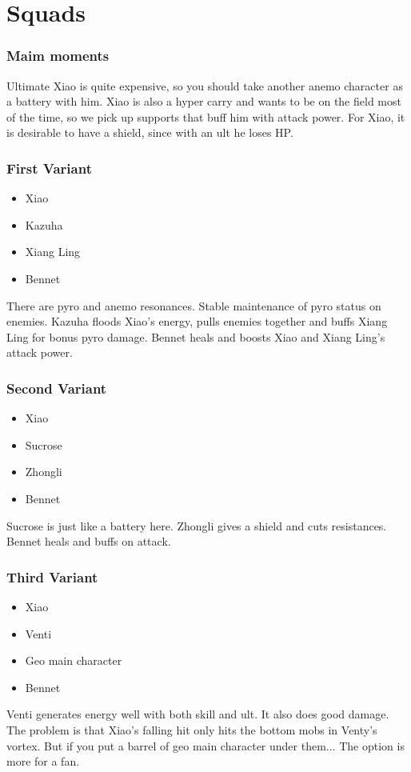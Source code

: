 \documentclass{beamer}
\begin{document}
\section{Squads}
\begin{frame}
\frametitle{Maim moments} 
Ultimate Xiao is quite expensive, so you should take another anemo character as a battery with him. Xiao is also a hyper carry and wants to be on the field most of the time, so we pick up supports that buff him with attack power. For Xiao, it is desirable to have a shield, since with an ult he loses HP.

\end{frame}
\begin{frame}
\frametitle{First Variant}
 \begin{itemize}
     \item Xiao
     \item Kazuha
     \item Xiang Ling
     \item Bennet
 \end{itemize}
 There are pyro and anemo resonances. Stable maintenance of pyro status on enemies. Kazuha floods Xiao's energy, pulls enemies together and buffs Xiang Ling for bonus pyro damage. Bennet heals and boosts Xiao and Xiang Ling's attack power.
\end{frame}

\begin{frame}
\frametitle{Second Variant}
 \begin{itemize}
     \item Xiao
     \item Sucrose
     \item Zhongli
     \item Bennet
 \end{itemize}
Sucrose is just like a battery here. Zhongli gives a shield and cuts resistances. Bennet heals and buffs on attack.
\end{frame}

\begin{frame}
\frametitle{Third Variant}
 \begin{itemize}
     \item Xiao
     \item Venti
     \item Geo main character
     \item Bennet
 \end{itemize}
Venti generates energy well with both skill and ult. It also does good damage. The problem is that Xiao's falling hit only hits the bottom mobs in Venty's vortex. But if you put a barrel of geo main character under them... The option is more for a fan.
\end{frame}
    
\end{document}

